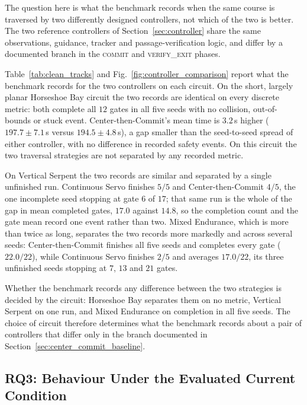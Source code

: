 The question here is what the benchmark records when the same course is
traversed by two differently designed controllers, not which of the two is
better. The two reference controllers of Section~\ref{sec:controller} share the
same observations, guidance, tracker and passage-verification logic, and differ
by a documented branch in the \textsc{commit} and \textsc{verify\_exit} phases.




Table~\ref{tab:clean_tracks} and Fig.~\ref{fig:controller_comparison} report
what the benchmark records for the two controllers on each circuit. On the
short, largely planar Horseshoe Bay circuit the two records are identical on
every discrete metric: both complete all $12$ gates in
all five seeds with no collision, out-of-bounds or stuck event.
Center-then-Commit's mean time is $3.2$\,s higher ($197.7\pm7.1$\,s versus
$194.5\pm4.8$\,s), a gap smaller than the seed-to-seed spread of either
controller, with no difference in recorded safety events. On this circuit the
two traversal strategies are not separated by any recorded metric.

On Vertical Serpent the two records are similar and separated by a single
unfinished run. Continuous Servo finishes $5/5$ and Center-then-Commit $4/5$,
the one incomplete seed stopping at gate $6$ of $17$; that same run is the whole
of the gap in mean completed gates, $17.0$ against $14.8$, so the completion
count and the gate mean record one event rather than two. Mixed Endurance, which
is more than twice as long, separates the two records more markedly and across
several seeds: Center-then-Commit finishes all five seeds and completes every
gate ($22.0/22$), while Continuous Servo finishes $2/5$ and averages $17.0/22$,
its three unfinished seeds stopping at $7$, $13$ and $21$ gates.

Whether the benchmark records any difference between the two strategies is
decided by the circuit: Horseshoe Bay separates them on no metric, Vertical
Serpent on one run, and Mixed Endurance on completion in all five seeds. The
choice of circuit therefore determines what the benchmark records about a pair
of controllers that differ only in the branch documented in
Section~\ref{sec:center_commit_baseline}.

\subsection{RQ3: Behaviour Under the Evaluated Current Condition}
\label{sec:eval_rq3}

